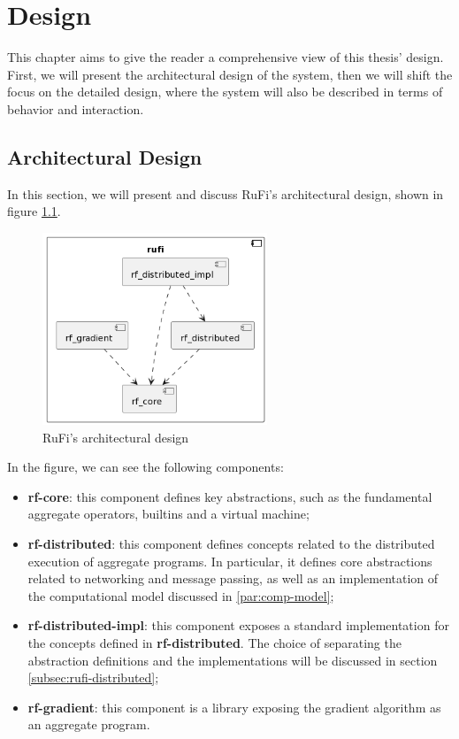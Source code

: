 
\chapter{Design}
\label{chap:design}
This chapter aims to give the reader a comprehensive view of this thesis' design. First, we will present the architectural design of the system, then we will shift the focus on
the detailed design, where the system will also be described in terms of behavior and interaction.

\section{Architectural Design}
\label{sec:architectural-design}
In this section, we will present and discuss RuFi's architectural design, shown in figure \ref{fig:rufi-architecture}.

\begin{figure}[ht!]
    \centering
    \includegraphics[width=0.6\textwidth]{figures/diagrams/img/rufi-architecture.png}
    \caption{RuFi's architectural design}
    \label{fig:rufi-architecture}
\end{figure}

In the figure, we can see the following components:

\begin{itemize}
    \item \textbf{rf-core}: this component defines key abstractions, such as the fundamental aggregate operators, builtins and a virtual machine;
    \item \textbf{rf-distributed}: this component defines concepts related to the distributed execution of aggregate programs.
          In particular, it defines core abstractions related to networking and message passing, as well as an implementation of the computational model discussed in \ref{par:comp-model};
    \item \textbf{rf-distributed-impl}: this component exposes a standard implementation for the concepts defined in \textbf{rf-distributed}.
          The choice of separating the abstraction definitions and the implementations will be discussed in section \ref{subsec:rufi-distributed};
    \item \textbf{rf-gradient}: this component is a library exposing the gradient algorithm as an aggregate program.
\end{itemize}

